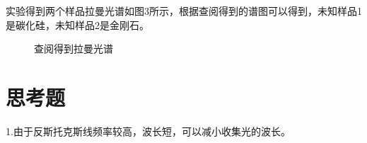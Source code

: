 \documentclass{article}
\begin{document}
实验得到两个样品拉曼光谱如图3所示，根据查阅得到的谱图可以得到，未知样品1是碳化硅，未知样品2是金刚石。
\begin{figure}[!h]
	\centering
	
	
	\caption{\heiti{}查阅得到拉曼光谱}
	
\end{figure}
	
	
	\section{思考题}
	1.由于反斯托克斯线频率较高，波长短，可以减小收集光的波长。
	
\end{document}
